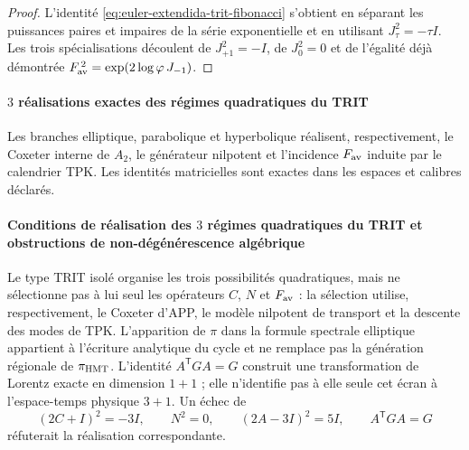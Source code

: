 \begin{proof}
L'identité \eqref{eq:euler-extendida-trit-fibonacci} s'obtient en séparant
les puissances paires et impaires de la série exponentielle et en utilisant
\(J_\tau^2=-\tau I\). Les trois spécialisations découlent de
\(J_{+1}^2=-I\), de \(J_0^2=0\) et de l'égalité déjà démontrée
\(F_{\rm av}^{\,2}=\exp(2\log\varphi\,J_{-1})\).
\end{proof}

\paragraph{\(3\) réalisations exactes des régimes quadratiques du TRIT}
Les branches elliptique, parabolique et hyperbolique réalisent, respectivement, le
Coxeter interne de \(A_2\), le générateur nilpotent et l'incidence
\(F_{\rm av}\) induite par le calendrier TPK. Les identités matricielles
sont exactes dans les espaces et calibres déclarés.

\paragraph{Conditions de réalisation des \(3\) régimes quadratiques du TRIT et obstructions de non-dégénérescence algébrique}
Le type TRIT isolé organise les trois possibilités quadratiques, mais ne
sélectionne pas à lui seul les opérateurs \(C\), \(N\) et \(F_{\rm av}\) : la
sélection utilise, respectivement, le Coxeter d'APP, le modèle nilpotent
de transport et la descente des modes de TPK. L'apparition de \(\pi\) dans la
formule spectrale elliptique appartient à l'écriture analytique du cycle et
ne remplace pas la génération régionale de \(\pi_{\rm HMT}\). L'identité
\(A^{\mathsf T}GA=G\) construit une transformation de Lorentz exacte en
dimension \(1+1\) ; elle n'identifie pas à elle seule cet écran à
l'espace-temps physique \(3+1\). Un échec de
\[
(2C+I)^2=-3I,\qquad N^2=0,\qquad
(2A-3I)^2=5I,\qquad A^{\mathsf T}GA=G
\]
réfuterait la réalisation correspondante.
